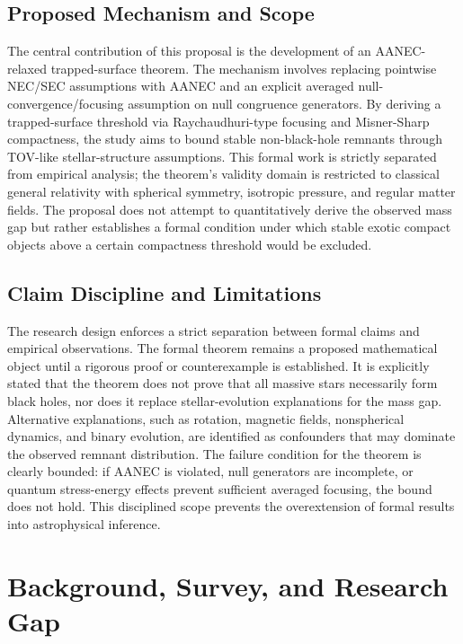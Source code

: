 \documentclass[conference]{IEEEtran}
\begin{document}
\subsection{Proposed Mechanism and Scope}
The central contribution of this proposal is the development of an AANEC-relaxed trapped-surface theorem. The mechanism involves replacing pointwise NEC/SEC assumptions with AANEC and an explicit averaged null-convergence/focusing assumption on null congruence generators. By deriving a trapped-surface threshold via Raychaudhuri-type focusing and Misner-Sharp compactness, the study aims to bound stable non-black-hole remnants through TOV-like stellar-structure assumptions. This formal work is strictly separated from empirical analysis; the theorem's validity domain is restricted to classical general relativity with spherical symmetry, isotropic pressure, and regular matter fields. The proposal does not attempt to quantitatively derive the observed mass gap but rather establishes a formal condition under which stable exotic compact objects above a certain compactness threshold would be excluded.

\subsection{Claim Discipline and Limitations}
The research design enforces a strict separation between formal claims and empirical observations. The formal theorem remains a proposed mathematical object until a rigorous proof or counterexample is established. It is explicitly stated that the theorem does not prove that all massive stars necessarily form black holes, nor does it replace stellar-evolution explanations for the mass gap. Alternative explanations, such as rotation, magnetic fields, nonspherical dynamics, and binary evolution, are identified as confounders that may dominate the observed remnant distribution. The failure condition for the theorem is clearly bounded: if AANEC is violated, null generators are incomplete, or quantum stress-energy effects prevent sufficient averaged focusing, the bound does not hold. This disciplined scope prevents the overextension of formal results into astrophysical inference.

\section{Background, Survey, and Research Gap}
\end{document}
